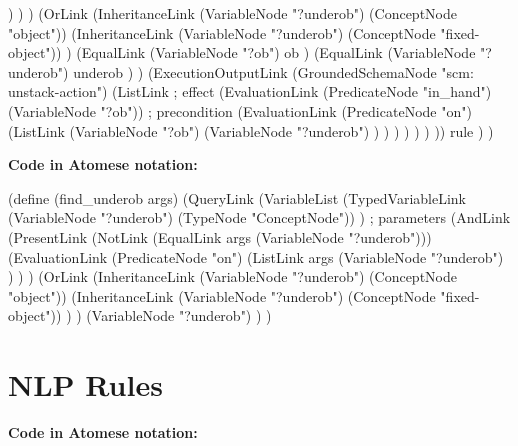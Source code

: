 \begin{python}
                )
              )
            )
            (OrLink
              (InheritanceLink
                (VariableNode "?underob")
                (ConceptNode "object"))
              (InheritanceLink
                (VariableNode "?underob")
                (ConceptNode "fixed-object"))
            )
            (EqualLink
              (VariableNode "?ob")
              ob
            )
            (EqualLink
              (VariableNode "?underob")
              underob
            )
          )
          (ExecutionOutputLink
            (GroundedSchemaNode "scm: unstack-action")
            (ListLink
              ; effect
              (EvaluationLink
                (PredicateNode "in_hand")
                (VariableNode "?ob"))
              ; precondition
              (EvaluationLink
                (PredicateNode "on")
                (ListLink
                  (VariableNode "?ob")
                  (VariableNode "?underob")
                )
              )
            )
          )
        )
      )
    ))
    rule
  )
)
\end{python}
 
\bigskip

\begin{footnotesize}
\textbf{Code in Atomese notation:} \\
\end{footnotesize}

\begin{python}
(define (find_underob args)
  (QueryLink
    (VariableList
      (TypedVariableLink 
        (VariableNode "?underob") 
        (TypeNode "ConceptNode"))
    ) ; parameters
    (AndLink
      (PresentLink
        (NotLink
          (EqualLink args 
          (VariableNode "?underob")))
        (EvaluationLink
          (PredicateNode "on")
            (ListLink
              args
              (VariableNode "?underob")
            )
        )
      )
      (OrLink
        (InheritanceLink
          (VariableNode "?underob")
          (ConceptNode "object"))
        (InheritanceLink
          (VariableNode "?underob")
          (ConceptNode "fixed-object"))
      )
    )
    (VariableNode "?underob")
  )
)
\end{python}


\section{NLP Rules}\label{sec:NLP} 

\begin{footnotesize}
\textbf{Code in Atomese notation:} \\
\end{footnotesize}

